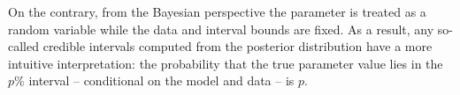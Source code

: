 On the contrary, from the Bayesian perspective the parameter is treated as a random variable while 
the data and interval bounds are fixed. As a result, any so-called credible intervals computed from the 
posterior distribution have a more intuitive interpretation: the probability that the true parameter value lies 
in the $p\%$ interval  -- conditional on the model and data -- is $p$. 



